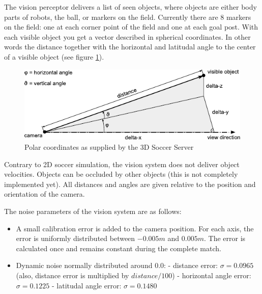 The vision perceptor delivers a list of seen objects, where objects are
either body parts of robots, the ball, or markers on the field. Currently
there are 8 markers on the field: one at each corner point of the
field and one at each goal post. With each visible object you get
a vector described in spherical coordinates. In other words the distance
together with the horizontal and latitudal angle to the center of a visible
object (see figure \ref{fig:polarcoordinates}).

\begin{figure}[htp]
  \centering
  \includegraphics[scale=1.4]{fig/agent_vision}
  \caption{Polar coordinates as supplied by the 3D Soccer Server}
  \label{fig:polarcoordinates}
\end{figure}

Contrary to 2D soccer simulation, the vision system does not deliver
object velocities. Objects can be occluded by other objects (this is
not completely implemented yet). All distances and angles are given
relative to the position and orientation of the camera.


The noise parameters of the vision system are as follows:
\begin{itemize}
  \item A small calibration error is added to the camera position. For each
  axis, the error is uniformly distributed between $-0.005 m$ and $0.005 m$. The
  error is calculated once and remains constant during the complete match.
  \item Dynamic noise normally distributed around $0.0$:
      \subitem - distance error: $\sigma = 0.0965$ (also, distance error is
      multiplied by $distance/100$)
      \subitem - horizontal angle error: $\sigma = 0.1225$
      \subitem - latitudal angle error: $\sigma = 0.1480$
\end{itemize}

